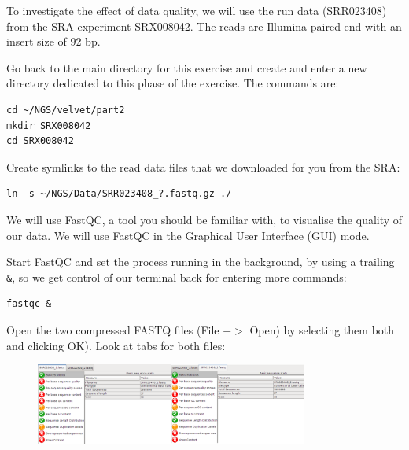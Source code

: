 \begin{information}
To investigate the effect of data quality, we will use the run data (SRR023408)
from the SRA experiment SRX008042. The reads are Illumina paired end with an
insert size of 92 bp.
\end{information}

\begin{steps}
Go back to the main directory for this exercise and create and enter a new
directory dedicated to this phase of the exercise. The commands are:
\begin{lstlisting}
cd ~/NGS/velvet/part2 
mkdir SRX008042 
cd SRX008042
\end{lstlisting}

Create symlinks to the read data files that we downloaded for you from the SRA:
\begin{lstlisting}
ln -s ~/NGS/Data/SRR023408_?.fastq.gz ./
\end{lstlisting}
\end{steps}

\begin{note}
We will use FastQC, a tool you should be familiar with, to visualise the quality
of our data. We will use FastQC in the Graphical User Interface (GUI) mode.
\end{note}

\begin{steps}
Start FastQC and set the process running in the background, by using a trailing
\texttt{\&}, so we get control of our terminal back for entering more commands:
\begin{lstlisting}
fastqc &
\end{lstlisting}
\end{steps}

\begin{steps}
Open the two compressed FASTQ files (File $->$ Open) by selecting them both and clicking OK).
Look at tabs for both files:
\end{steps}

\begin{figure}[H]
\centering
\includegraphics[width=0.8\textwidth]{de_novo/velvet/paired_fastqc.png}
\caption{\label{fig:paired_fastqc}}
\end{figure}

